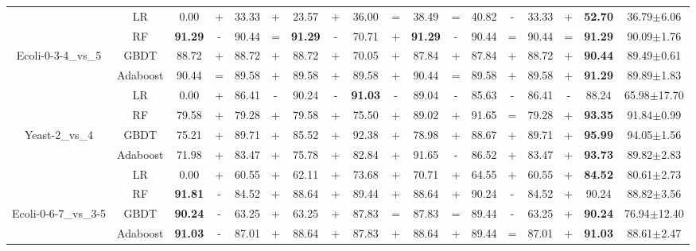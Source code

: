 \documentclass[journal]{IEEEtran}
\begin{document}
\begin{table*}
\begin{threeparttable}
\begin{tabular}{|c|c|cc|cc|cc|cc|cc|cc|cc|cc|}
			& LR    & 0.00  & +     & 33.33  & +     & 23.57  & +     & 36.00  & =     & 38.49  & =     & 40.82  & -     & 33.33  & +     & \textbf{52.70}  & 36.79$\pm$6.06  \\
			& RF    & \textbf{91.29}  & -     & 90.44  & =     & \textbf{91.29}  & -     & 70.71  & +     & \textbf{91.29}  & -     & 90.44  & =     & 90.44  & =     & \textbf{91.29}  & 90.09$\pm$1.76\\
			Ecoli-0-3-4\_vs\_5
			& GBDT  & 88.72  & +     & 88.72  & +     & 88.72  & +     & 70.05  & +     & 87.84  & +     & 87.84  & +     & 88.72  & +     & \textbf{90.44}  & 89.49$\pm$0.61  \\
			& Adaboost & 90.44  & =     & 89.58  & +     & 89.58  & +     & 89.58  & +     & 90.44  & =     & 89.58  & +     & 89.58  & +     & \textbf{91.29}  & 89.89$\pm$1.83  \\
			\hline
			
			
			& LR    & 0.00  & +     & 86.41  & -     & 90.24  & -     & \textbf{91.03}  & -     & 89.04  & -     & 85.63  & -     & 86.41  & -     & 88.24  & 65.98$\pm$17.70  \\
			& RF    & 79.58  & +     & 79.28  & +     & 79.58  & +     & 75.50  & +     & 89.02  & +     & 91.65  & =     & 79.28  & +     & \textbf{93.35}  & 91.84$\pm$0.99  \\
			Yeast-2\_vs\_4
			& GBDT  & 75.21  & +     & 89.71  & +     & 85.52  & +     & 92.38  & +     & 78.98  & +     & 88.67  & +     & 89.71  & +     & \textbf{95.99}  & 94.05$\pm$1.56  \\
			& Adaboost & 71.98  & +     & 83.47  & +     & 75.78  & +     & 82.84  & +     & 91.65  & -     & 86.52  & +     & 83.47  & +     &\textbf{93.73}  & 89.82$\pm$2.83  \\\hline
			& LR    & 0.00  & +     & 60.55  & +     & 62.11  & +     & 73.68  & +     & 70.71  & +     & 64.55  & +     & 60.55  & +     &\textbf{84.52}  & 80.61$\pm$2.73  \\
			& RF    &\textbf{91.81}  & -     & 84.52  & +     & 88.64  & +     & 89.44  & +     & 88.64  & +     & 90.24  & -     & 84.52  & +     &90.24  & 88.82$\pm$3.56  \\
			Ecoli-0-6-7\_vs\_3-5
			& GBDT  & \textbf{90.24}  & -     & 63.25  & +     & 63.25  & +     & 87.83  & =     & 87.83  & =     & 89.44  & -     & 63.25  & +     & \textbf{90.24}  & 76.94$\pm$12.40  \\
			& Adaboost & \textbf{91.03}  & -     & 87.01  & +     & 88.64  & +     & 87.83  & +     & 88.64  & +     & 89.44  & =     & 87.01  & +     & \textbf{91.03}  & 88.61$\pm$2.47  \\
			\hline
			

\end{tabular}
\end{threeparttable}
\end{table*}
\end{document}
